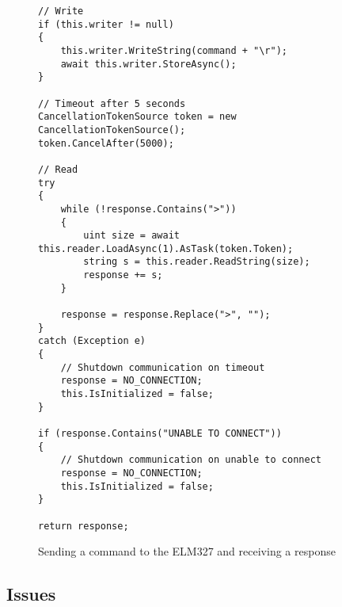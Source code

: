 		\begin{figure}[h]
			\begin{lstlisting}
// Write
if (this.writer != null)
{
    this.writer.WriteString(command + "\r");
	await this.writer.StoreAsync();
}

// Timeout after 5 seconds                
CancellationTokenSource token = new CancellationTokenSource();
token.CancelAfter(5000);

// Read
try
{
	while (!response.Contains(">"))
	{
		uint size = await this.reader.LoadAsync(1).AsTask(token.Token);                        
        string s = this.reader.ReadString(size);
		response += s;
	}
    
    response = response.Replace(">", "");
}
catch (Exception e)
{
	// Shutdown communication on timeout
	response = NO_CONNECTION;
	this.IsInitialized = false;
}                

if (response.Contains("UNABLE TO CONNECT"))
{
	// Shutdown communication on unable to connect
	response = NO_CONNECTION;
    this.IsInitialized = false;
}

return response;
			\end{lstlisting}
			\caption{Sending a command to the ELM327 and receiving a response}
			\label{code:BTConnectionSend}
		\end{figure}		
		
	\subsection{Issues}
